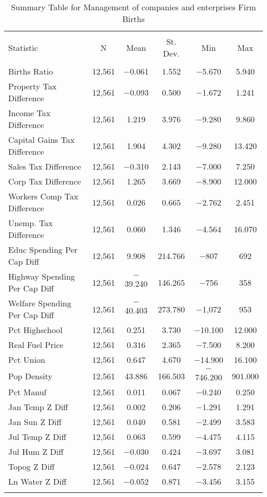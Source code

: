 
\begin{table}[!htbp] \centering 
  \caption{Summary Table for  Management of companies and enterprises Firm Births} 
  \label{55summary} 
\begin{tabular}{@{\extracolsep{5pt}}lccccc} 
\\[-1.8ex]\hline 
\hline \\[-1.8ex] 
Statistic & \multicolumn{1}{c}{N} & \multicolumn{1}{c}{Mean} & \multicolumn{1}{c}{St. Dev.} & \multicolumn{1}{c}{Min} & \multicolumn{1}{c}{Max} \\ 
\hline \\[-1.8ex] 
Births Ratio & 12,561 & $-$0.061 & 1.552 & $-$5.670 & 5.940 \\ 
Property Tax Difference & 12,561 & $-$0.093 & 0.500 & $-$1.672 & 1.241 \\ 
Income Tax Difference & 12,561 & 1.219 & 3.976 & $-$9.280 & 9.860 \\ 
Capital Gains Tax Difference & 12,561 & 1.904 & 4.302 & $-$9.280 & 13.420 \\ 
Sales Tax Difference & 12,561 & $-$0.310 & 2.143 & $-$7.000 & 7.250 \\ 
Corp Tax Difference & 12,561 & 1.265 & 3.669 & $-$8.900 & 12.000 \\ 
Workers Comp Tax Difference & 12,561 & 0.026 & 0.665 & $-$2.762 & 2.451 \\ 
Unemp. Tax Difference & 12,561 & 0.060 & 1.346 & $-$4.564 & 16.070 \\ 
Educ Spending Per Cap Diff & 12,561 & 9.908 & 214.766 & $-$807 & 692 \\ 
Highway Spending Per Cap Diff & 12,561 & $-$39.240 & 146.265 & $-$756 & 358 \\ 
Welfare Spending Per Cap Diff & 12,561 & $-$40.403 & 273.780 & $-$1,072 & 953 \\ 
Pct Highschool & 12,561 & 0.251 & 3.730 & $-$10.100 & 12.000 \\ 
Real Fuel Price & 12,561 & 0.316 & 2.365 & $-$7.500 & 8.200 \\ 
Pct Union & 12,561 & 0.647 & 4.670 & $-$14.900 & 16.100 \\ 
Pop Density & 12,561 & 43.886 & 166.503 & $-$746.200 & 901.000 \\ 
Pct Manuf & 12,561 & 0.011 & 0.067 & $-$0.240 & 0.250 \\ 
Jan Temp Z Diff & 12,561 & 0.002 & 0.206 & $-$1.291 & 1.291 \\ 
Jan Sun Z Diff & 12,561 & 0.040 & 0.581 & $-$2.499 & 3.583 \\ 
Jul Temp Z Diff & 12,561 & 0.063 & 0.599 & $-$4.475 & 4.115 \\ 
Jul Hum Z Diff & 12,561 & $-$0.030 & 0.424 & $-$3.697 & 3.081 \\ 
Topog Z Diff & 12,561 & $-$0.024 & 0.647 & $-$2.578 & 2.123 \\ 
Ln Water Z Diff & 12,561 & $-$0.052 & 0.871 & $-$3.456 & 3.155 \\ 
\hline \\[-1.8ex] 
\end{tabular} 
\end{table} 
